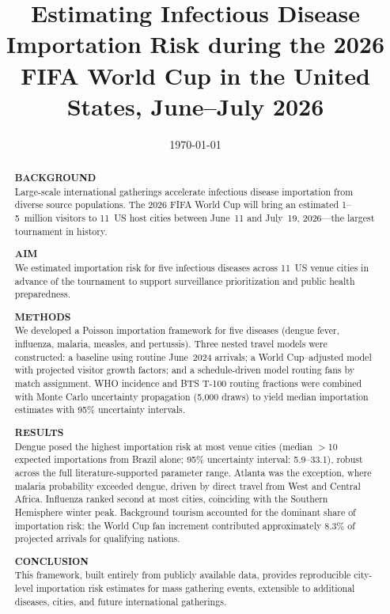 \documentclass[12pt]{article}
\title{\textbf{Estimating Infectious Disease Importation Risk
during the 2026 FIFA World Cup in the United States, June--July 2026}}
\date{\today}
\begin{document}
\maketitle
\linenumbers

\begin{abstract}
\noindent\textbf{BACKGROUND}\\
Large-scale international gatherings accelerate infectious disease
importation from diverse source populations. The 2026 FIFA World
Cup will bring an estimated 1--5~million visitors to 11~US host
cities between June~11 and July~19, 2026---the largest tournament
in history.

\medskip
\noindent\textbf{AIM}\\
We estimated importation risk for five infectious diseases across
11~US venue cities in advance of the tournament to support
surveillance prioritization and public health preparedness.

\medskip
\noindent\textbf{METHODS}\\
We developed a Poisson importation framework for five diseases
(dengue fever, influenza, malaria, measles, and pertussis). Three
nested travel models were constructed: a baseline using routine
June~2024 arrivals; a World Cup--adjusted model with projected
visitor growth factors; and a schedule-driven model routing fans
by match assignment. WHO incidence and BTS T-100 routing fractions
were combined with Monte Carlo uncertainty propagation (5,000
draws) to yield median importation estimates with 95\% uncertainty
intervals.

\medskip
\noindent\textbf{RESULTS}\\
Dengue posed the highest importation risk at most venue cities
(median $>$10 expected importations from Brazil alone; 95\%
uncertainty interval: 5.9--33.1), robust across the full
literature-supported parameter range. Atlanta was the exception,
where malaria probability exceeded dengue, driven by direct travel
from West and Central Africa. Influenza ranked second at most
cities, coinciding with the Southern Hemisphere winter peak.
Background tourism accounted for the dominant share of importation
risk; the World Cup fan increment contributed approximately 8.3\%
of projected arrivals for qualifying nations.

\medskip
\noindent\textbf{CONCLUSION}\\
This framework, built entirely from publicly available data,
provides reproducible city-level importation risk estimates for
mass gathering events, extensible to additional diseases, cities,
and future international gatherings.
\end{abstract}
\end{document}
